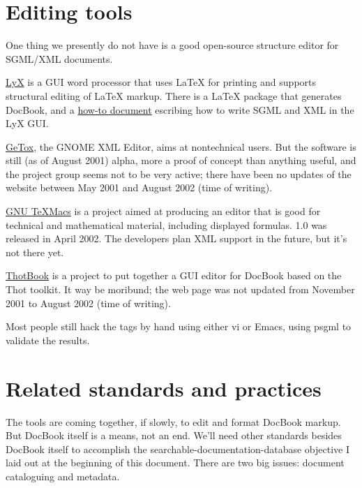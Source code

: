 \documentclass[pdftex,english,a4paper,10pt]{infocom}
\begin{document}
\section{Editing tools}
\label{id177539}\hypertarget{id177539}{}%

One thing we presently do not have is a good open-source
structure editor for SGML/XML documents.

\href{http://www.lyx.org/}{LyX} is a GUI word processor
that uses LaTeX for printing and supports structural editing of LaTeX
markup.  There is a LaTeX package that generates DocBook, and a
\href{http://bgu.chez.tiscali.fr/doc/db4lyx/}{how-to document}
escribing how to write SGML and XML in the LyX GUI.

\href{http://idx-getox.idealx.org/}{GeTox}, the
GNOME XML Editor, aims at nontechnical users.  But the software is
still (as of August 2001) alpha, more a proof of concept than anything
useful, and the project group seems not to be very active; there have
been no updates of the website between May 2001 and August 2002 (time of
writing).

\href{http://www.math.u-psud.fr/~anh/TeXmacs/TeXmacs.html}{ GNU
TeXMacs} is a project aimed at producing an editor that is good
for technical and mathematical material, including displayed formulas.
1.0 was released in April 2002.  The developers plan XML support in
the future, but it's not there yet.

\href{http://www.freesoftware.fsf.org/thotbook/}{ThotBook}
is a project to put together a GUI editor for DocBook based on
the Thot toolkit.  It way be moribund; the web page was not updated
from November 2001 to August 2002 (time of writing).

Most people still hack the tags by hand using either vi or Emacs, using
psgml to validate the results.

\section{Related standards and practices}
\label{id177596}\hypertarget{id177596}{}%

The tools are coming together, if slowly, to edit and format
DocBook markup. But DocBook itself is a means, not an end.  We'll need
other standards besides DocBook itself to accomplish the
searchable-documentation-database objective I laid out at the
beginning of this document. There are two big issues: document
cataloguing and metadata.
\end{document}
